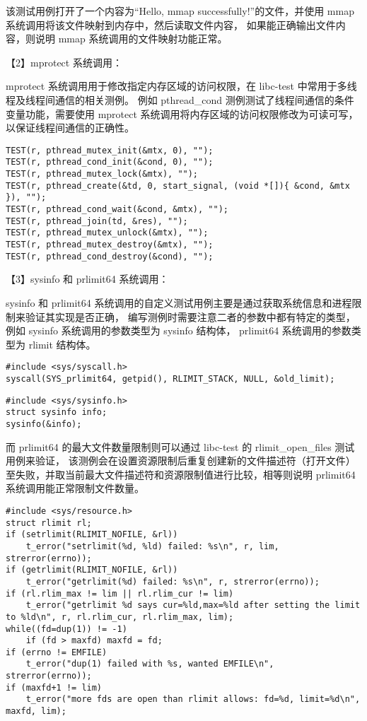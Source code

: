 该测试用例打开了一个内容为“Hello, mmap successfully!”的文件，并使用 mmap 系统调用将该文件映射到内存中，然后读取文件内容，
如果能正确输出文件内容，则说明 mmap 系统调用的文件映射功能正常。

【2】mprotect 系统调用：

mprotect 系统调用用于修改指定内存区域的访问权限，在 libc-test 中常用于多线程及线程间通信的相关测例。
例如 pthread\_cond 测例测试了线程间通信的条件变量功能，需要使用 mprotect 系统调用将内存区域的访问权限修改为可读可写，
以保证线程间通信的正确性。

\begin{lstlisting}[caption= pthread\_cond 测例通过条件变量实现线程间通信]
TEST(r, pthread_mutex_init(&mtx, 0), "");
TEST(r, pthread_cond_init(&cond, 0), "");
TEST(r, pthread_mutex_lock(&mtx), "");
TEST(r, pthread_create(&td, 0, start_signal, (void *[]){ &cond, &mtx }), "");
TEST(r, pthread_cond_wait(&cond, &mtx), "");
TEST(r, pthread_join(td, &res), "");
TEST(r, pthread_mutex_unlock(&mtx), "");
TEST(r, pthread_mutex_destroy(&mtx), "");
TEST(r, pthread_cond_destroy(&cond), "");
\end{lstlisting}

【3】sysinfo 和 prlimit64 系统调用：

sysinfo 和 prlimit64 系统调用的自定义测试用例主要是通过获取系统信息和进程限制来验证其实现是否正确，
编写测例时需要注意二者的参数中都有特定的类型，例如 sysinfo 系统调用的参数类型为 sysinfo 结构体，
prlimit64 系统调用的参数类型为 rlimit 结构体。

\begin{lstlisting}[caption=prlimit64 测例部分代码]
#include <sys/syscall.h>
syscall(SYS_prlimit64, getpid(), RLIMIT_STACK, NULL, &old_limit);
\end{lstlisting}

\begin{lstlisting}[caption=sysinfo 测例部分代码]
#include <sys/sysinfo.h>
struct sysinfo info;
sysinfo(&info);
\end{lstlisting}

而 prlimit64 的最大文件数量限制则可以通过 libc-test 的 rlimit\_open\_files 测试用例来验证，
该测例会在设置资源限制后重复创建新的文件描述符（打开文件）至失败，并取当前最大文件描述符和资源限制值进行比较，相等则说明 prlimit64 系统调用能正常限制文件数量。

\begin{lstlisting}[caption=rlimit\_open\_files 测例设置资源限制并进行检验]
#include <sys/resource.h>
struct rlimit rl;
if (setrlimit(RLIMIT_NOFILE, &rl))
	t_error("setrlimit(%d, %ld) failed: %s\n", r, lim, strerror(errno));
if (getrlimit(RLIMIT_NOFILE, &rl))
	t_error("getrlimit(%d) failed: %s\n", r, strerror(errno));
if (rl.rlim_max != lim || rl.rlim_cur != lim)
	t_error("getrlimit %d says cur=%ld,max=%ld after setting the limit to %ld\n", r, rl.rlim_cur, rl.rlim_max, lim);
while((fd=dup(1)) != -1)
	if (fd > maxfd) maxfd = fd;
if (errno != EMFILE)
	t_error("dup(1) failed with %s, wanted EMFILE\n", strerror(errno));
if (maxfd+1 != lim)
	t_error("more fds are open than rlimit allows: fd=%d, limit=%d\n", maxfd, lim);
\end{lstlisting}


